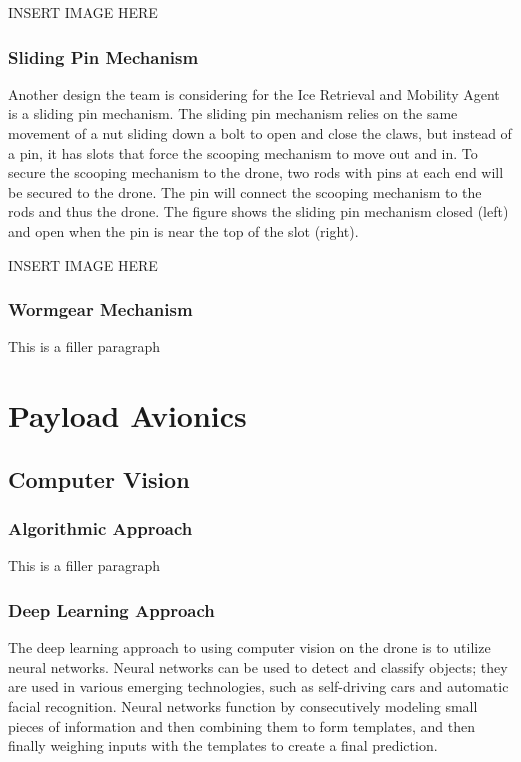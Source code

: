 			INSERT IMAGE HERE

		\subsubsection{Sliding Pin Mechanism}
			Another design the team is considering for the Ice Retrieval and Mobility Agent is a sliding pin mechanism. The sliding pin mechanism relies on the same movement of a nut sliding down a bolt to open and close the claws, but instead of a pin, it has slots that force the scooping mechanism to move out and in. To secure the scooping mechanism to the drone, two rods with pins at each end will be secured to the drone. The pin will connect the scooping mechanism to the rods and thus the drone. The figure shows the sliding pin mechanism closed (left) and open when the pin is near the top of the slot (right). 

			INSERT IMAGE HERE

		\subsubsection{Wormgear Mechanism}
			This is a filler paragraph

\section{Payload Avionics}\label{PL:Deployment:Avionics}
	\subsection{Computer Vision}
		\subsubsection{Algorithmic Approach}
			This is a filler paragraph

		\subsubsection{Deep Learning Approach}
		The deep learning approach to using computer vision on the drone is to utilize neural networks. Neural networks can be used to detect and classify objects; they are used in various emerging technologies, such as self-driving cars and automatic facial recognition. 
		Neural networks function by consecutively modeling small pieces of information and then combining them to form templates, and then finally weighing inputs with the templates to create a final prediction.
		
